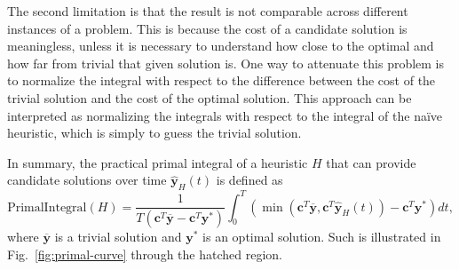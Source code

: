 The second limitation is that the result is not comparable across different instances of a problem.
This is because the cost of a candidate solution is meaningless, unless it is necessary to understand how close to the optimal and how far from trivial that given solution is.
One way to attenuate this problem is to normalize the integral with respect to the difference between the cost of the trivial solution and the cost of the optimal solution.
This approach can be interpreted as normalizing the integrals with respect to the integral of the naïve heuristic, which is simply to guess the trivial solution.

In summary, the practical primal integral of a heuristic $H$ that can provide candidate solutions over time $\hat{\bm{y}}_H(t)$ is defined as
\begin{equation}\label{eq:primal-integral}
    \text{PrimalIntegral}(H) = \frac{1}{T(\bm{c}^T \overline{\bm{y}} - \bm{c}^T \bm{y}^*)} \int_0^{T} \left( \min\left( \bm{c}^T \overline{\bm{y}}, \bm{c}^{T} \hat{\bm{y}}_H(t) \right)  - \bm{c}^{T} \bm{y}^* \right)  dt
,\end{equation}
where $\overline{\bm{y}}$ is a trivial solution and $\bm{y}^*$ is an optimal solution.
Such is illustrated in Fig.~\ref{fig:primal-curve} through the hatched region.

